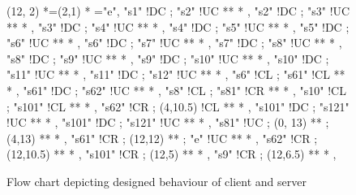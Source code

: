 \begin{figure}[Hbt]
(12, 2)  	 *=(2,1)  							*\frm{-} ="e",
%
"s1" !DC ; "s2" !UC **\dir{-} *\dir{>} ,
"s2" !DC ; "s3" !UC **\dir{-} *\dir{>} ,
"s3" !DC ; "s4" !UC **\dir{-} *\dir{>} ,
"s4" !DC ; "s5" !UC **\dir{-} *\dir{>} ,
"s5" !DC ; "s6" !UC **\dir{-} *\dir{>} ,
"s6" !DC ; "s7" !UC **\dir{-} *\dir{>} ,
"s7"  !DC ; "s8"  !UC **\dir{-} *\dir{>} ,
"s8"  !DC ; "s9"  !UC **\dir{-} *\dir{>} ,
"s9"  !DC ; "s10" !UC **\dir{-} *\dir{>} ,
"s10" !DC ; "s11" !UC **\dir{-} *\dir{>} ,
"s11" !DC ; "s12" !UC **\dir{-} *\dir{>} ,
%
"s6"  !CL ; "s61" !CL **\dir{-} *\dir{>} ,
"s61" !DC ; "s62" !UC **\dir{-} *\dir{>} ,
%
"s8"  !CL ; "s81" !CR **\dir{-} *\dir{>} ,
%
"s10"  !CL ; "s101" !CL **\dir{-} *\dir{>} ,
%
"s62"  !CR ; (4,10.5) !CL **\dir{-} *\dir{>} ,
%
"s101"  !DC ; "s121" !UC **\dir{-} *\dir{>} ,
%
"s101"  !DC ; "s121" !UC **\dir{-} *\dir{>} ,
%
"s81"  !UC ; (0, 13) **\dir{-} ; (4,13) **\dir{-} *\dir{>} ,
%
"s61"  !CR ; (12,12) **\dir{-} ; "e" !UC **\dir{-} *\dir{>} ,
"s62"  !CR ; (12,10.5) **\dir{-} *\dir{>} ,
%
"s101"  !CR ; (12,5) **\dir{-} *\dir{>} ,
%
"s9"  !CR ; (12,6.5) **\dir{-} *\dir{>} ,
\endxy


\caption{Flow chart depicting designed behaviour of client and server}

\end{figure}
